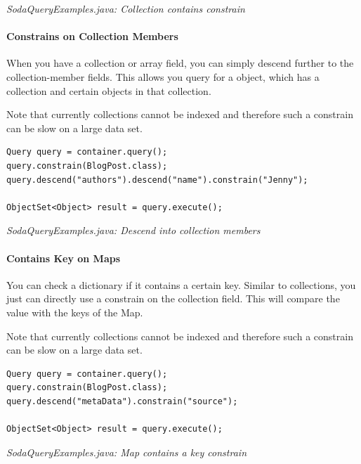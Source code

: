{\small\itshape SodaQueryExamples.java: Collection contains constrain\par}
\medskip

\paragraph{Constrains on Collection Members}
\label{ref:basics-querying-soda-soda-special-case-examples:constrainsoncollectionmembers}

When you have a collection or array field, you can simply descend further to the collection-member fields. This allows you query for a object, which has a collection and certain objects in that collection.

Note that currently collections cannot be indexed and therefore such a constrain can be slow on a large data set.

\begin{lstlisting}
Query query = container.query();
query.constrain(BlogPost.class);
query.descend("authors").descend("name").constrain("Jenny");

ObjectSet<Object> result = query.execute();
\end{lstlisting}

{\small\itshape SodaQueryExamples.java: Descend into collection members\par}
\medskip

\paragraph{Contains Key on Maps}
\label{ref:basics-querying-soda-soda-special-case-examples:containskeyonmaps}

You can check a dictionary if it contains a certain key. Similar to collections, you just can directly use a constrain on the collection field. This will compare the value with the keys of the Map.

Note that currently collections cannot be indexed and therefore such a constrain can be slow on a large data set.

\begin{lstlisting}
Query query = container.query();
query.constrain(BlogPost.class);
query.descend("metaData").constrain("source");

ObjectSet<Object> result = query.execute();
\end{lstlisting}

{\small\itshape SodaQueryExamples.java: Map contains a key constrain\par}
\medskip


